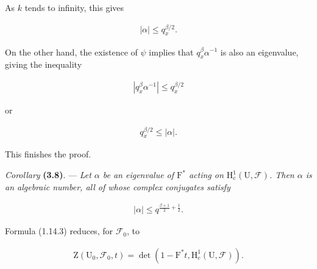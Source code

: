 \documentclass[10pt,leqno]{article}
\begin{document}
\noindent As \(k\) tends to infinity, this gives\par

\begin{equation*}\begin{gathered}|\alpha | \leq  q_{x}^{\beta /2}.\end{gathered}\end{equation*}

\noindent On the other hand, the existence of \(\psi \) implies that \(q_{x}^{\beta } \alpha ^{- 1}\) is also an eigenvalue, giving the inequality\par

\begin{equation*}\begin{gathered}|q_{x}^{\beta } \alpha ^{- 1}| \leq  q_{x}^{\beta /2}\end{gathered}\end{equation*}

\noindent or\par

\begin{equation*}\begin{gathered}q_{x}^{\beta /2} \leq  |\alpha |.\end{gathered}\end{equation*}

\noindent This finishes the proof.\par

\clearpage

\label{physical-15}

\noindent \emph{Corollary} \textbf{(3.8)}. — {\itshape Let \(\alpha \) be an eigenvalue of \(\mathrm{F}^{*}\) acting on \(\mathrm{H}_{c}^{1}(\mathrm{U},\mathcal{F} )\). Then \(\alpha \) is an algebraic number, all of whose complex conjugates satisfy}\par

\begin{equation*}\begin{gathered}|\alpha | \leq  q^{\frac{\beta+1}{2}+\frac{1}{2}}.\end{gathered}\end{equation*}

\noindent Formula (1.14.3) reduces, for \(\mathcal{F} _{0}\), to\par

\begin{equation*}\begin{gathered}\mathrm{Z}(\mathrm{U}_{0},\mathcal{F} _{0},t) = \operatorname{det}(1- \mathrm{F}^{*}t,\mathrm{H}_{c}^{1}(\mathrm{U},\mathcal{F} )).\end{gathered}\end{equation*}
\end{document}
